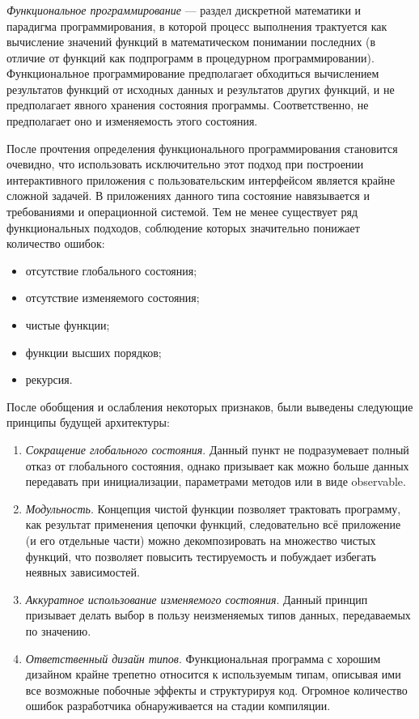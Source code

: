 \subsubsection{}
\label{sec:analysis:research:mobArch:fp}

\emph{Функциональное программирование} --- раздел дискретной математики и парадигма программирования, в которой процесс выполнения трактуется как вычисление значений функций в математическом понимании последних (в отличие от функций как подпрограмм в процедурном программировании). Функциональное программирование предполагает обходиться вычислением результатов функций от исходных данных и результатов других функций, и не предполагает явного хранения состояния программы. Соответственно, не предполагает оно и изменяемость этого состояния. \cite{wiki:fp}

После прочтения определения функционального программирования становится очевидно, что использовать исключительно этот подход при построении интерактивного приложения с пользовательским интерфейсом является крайне сложной задачей. В приложениях данного типа состояние навязывается и требованиями и операционной системой. Тем не менее существует ряд функциональных подходов, соблюдение которых значительно понижает количество ошибок:

\begin{itemize}
\item отсутствие глобального состояния;
\item отсутствие изменяемого состояния;
\item чистые функции;
\item функции высших порядков;
\item рекурсия.
\end{itemize}

После обобщения и ослабления некоторых признаков, были выведены следующие принципы будущей архитектуры:

\begin{enumerate}
\item \emph{Сокращение глобального состояния}. Данный пункт не подразумевает полный отказ от глобального состояния, однако призывает как можно больше данных передавать при инициализации, параметрами методов или в виде \gls{observable}.
\item \emph{Модульность}. Концепция чистой функции позволяет трактовать программу, как результат применения цепочки функций, следовательно всё приложение (и его отдельные части) можно декомпозировать на множество чистых функций, что позволяет повысить тестируемость и побуждает избегать неявных зависимостей.
\item \emph {Аккуратное использование изменяемого состояния}. Данный принцип призывает делать выбор в пользу неизменяемых типов данных, передаваемых по значению. 
\item \emph {Ответственный дизайн типов}. Функциональная программа с хорошим дизайном крайне трепетно относится к используемым типам, описывая ими все возможные побочные эффекты и структурируя код. Огромное количество ошибок разработчика обнаруживается на стадии компиляции.
\end{enumerate}


